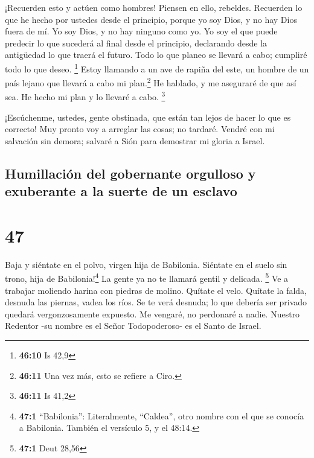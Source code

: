  ¡Recuerden esto y actúen como hombres! Piensen en ello,
rebeldes.  Recuerden lo que he hecho por ustedes desde el
principio, porque yo soy Dios, y no hay Dios fuera de mí. Yo soy Dios, y
no hay ninguno como yo.  Yo soy el que puede predecir lo
que sucederá al final desde el principio, declarando desde la antigüedad
lo que traerá el futuro. Todo lo que planeo se llevará a cabo; cumpliré
todo lo que deseo. \footnote{\textbf{46:10} Is 42,9} 
Estoy llamando a un ave de rapiña del este, un hombre de un país lejano
que llevará a cabo mi plan.\footnote{\textbf{46:11} Una vez más, esto se
  refiere a Ciro.} He hablado, y me aseguraré de que así sea. He hecho
mi plan y lo llevaré a cabo. \footnote{\textbf{46:11} Is 41,2}

 ¡Escúchenme, ustedes, gente obstinada, que están tan
lejos de hacer lo que es correcto!  Muy pronto voy a
arreglar las cosas; no tardaré. Vendré con mi salvación sin demora;
salvaré a Sión para demostrar mi gloria a Israel.

\hypertarget{humillaciuxf3n-del-gobernante-orgulloso-y-exuberante-a-la-suerte-de-un-esclavo}{%
\subsection{Humillación del gobernante orgulloso y exuberante a la
suerte de un
esclavo}\label{humillaciuxf3n-del-gobernante-orgulloso-y-exuberante-a-la-suerte-de-un-esclavo}}

\hypertarget{section-46}{%
\section{47}\label{section-46}}

 Baja y siéntate en el polvo, virgen hija de Babilonia.
Siéntate en el suelo sin trono, hija de Babilonia!\footnote{\textbf{47:1}
  ``Babilonia'': Literalmente, ``Caldea'', otro nombre con el que se
  conocía a Babilonia. También el versículo 5, y el 48:14.} La gente ya
no te llamará gentil y delicada. \footnote{\textbf{47:1} Deut 28,56}
 Ve a trabajar moliendo harina con piedras de molino.
Quítate el velo. Quítate la falda, desnuda las piernas, vadea los ríos.
 Se te verá desnuda; lo que debería ser privado quedará
vergonzosamente expuesto. Me vengaré, no perdonaré a nadie.
 Nuestro Redentor -su nombre es el Señor Todopoderoso- es
el Santo de Israel.

